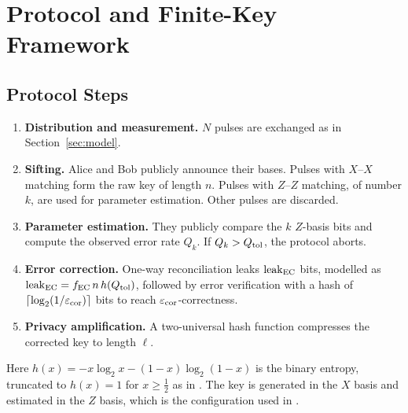 \section{Protocol and Finite-Key Framework}\label{sec:protocol}

\subsection{Protocol Steps}
\begin{enumerate}
\item \textbf{Distribution and measurement.} $N$ pulses are exchanged as in Section~\ref{sec:model}.
\item \textbf{Sifting.} Alice and Bob publicly announce their bases. Pulses with $X$--$X$ matching form the raw key of length $n$. Pulses with $Z$--$Z$ matching, of number $k$, are used for parameter estimation. Other pulses are discarded.
\item \textbf{Parameter estimation.} They publicly compare the $k$ $Z$-basis bits and compute the observed error rate $Q_k$. If $Q_k>Q_{\mathrm{tol}}$, the protocol aborts.
\item \textbf{Error correction.} One-way reconciliation \cite{BrassardSalvail93} leaks $\mathrm{leak}_{\mathrm{EC}}$ bits, modelled as $\mathrm{leak}_{\mathrm{EC}}=f_{\mathrm{EC}}\,n\,h(Q_{\mathrm{tol}})$, followed by error verification with a hash of $\lceil\log_2(1/\varepsilon_{\mathrm{cor}})\rceil$ bits to reach $\varepsilon_{\mathrm{cor}}$-correctness.
\item \textbf{Privacy amplification.} A two-universal hash function \cite{BBCM95,RennerKoenig05} compresses the corrected key to length $\ell$.
\end{enumerate}
Here $h(x)=-x\log_2x-(1-x)\log_2(1-x)$ is the binary entropy, truncated to $h(x)=1$ for $x\ge\tfrac12$ as in \cite{Tomamichel12}. The key is generated in the $X$ basis and estimated in the $Z$ basis, which is the configuration used in \cite{Tomamichel12}.

